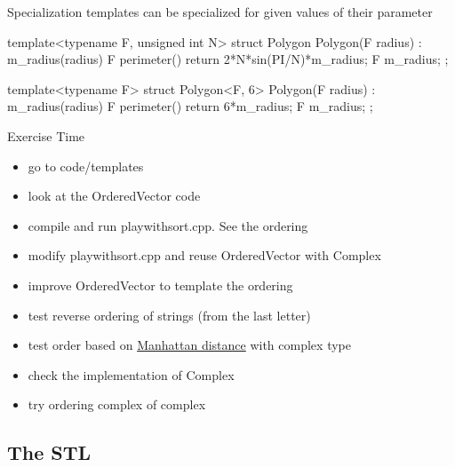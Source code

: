 \begin{frame}[fragile]
  \begin{block}{Specialization}
    templates can be specialized for given values of their parameter
  \end{block}
  \begin{cppcode*}{}
    template<typename F, unsigned int N> struct Polygon {
      Polygon(F radius) : m_radius(radius) {}
      F perimeter() {return 2*N*sin(PI/N)*m_radius;}
      F m_radius;
    };

    template<typename F>
    struct Polygon<F, 6> {
      Polygon(F radius) : m_radius(radius) {}
      F perimeter() {return 6*m_radius;}
      F m_radius;
    };
  \end{cppcode*}
\end{frame}

\begin{frame}[fragile]
  \begin{alertblock}{Exercise Time}
    \begin{itemize}
    \item go to code/templates
    \item look at the OrderedVector code
    \item compile and run playwithsort.cpp. See the ordering
    \item modify playwithsort.cpp and reuse OrderedVector with Complex
    \item improve OrderedVector to template the ordering
    \item test reverse ordering of strings (from the last letter)
    \item test order based on {\color{blue} \href{https://en.wikipedia.org/wiki/Taxicab_geometry}{Manhattan distance}} with complex type
    \item check the implementation of Complex
    \item try ordering complex of complex
    \end{itemize}
  \end{alertblock}
\end{frame}

\subsection[STL]{The STL}

